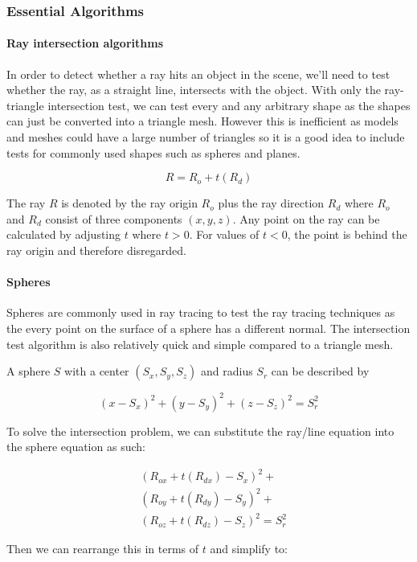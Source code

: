 \documentclass[final]{cmpreport}
\begin{document}
\subsubsection{Essential Algorithms}
\paragraph{Ray intersection algorithms} In order to detect whether a ray hits an object in the scene, we'll need to test whether the ray, as a straight line, intersects with the object. With only the ray-triangle intersection test, we can test every and any arbitrary shape as the shapes can just be converted into a triangle mesh. However this is inefficient as models and meshes could have a large number of triangles so it is a good idea to include tests for commonly used shapes such as spheres and planes.

\[ R = R_o + t(R_d) \]

The ray \( R \) is denoted by the ray origin \( R_o \) plus the ray direction \( R_d \) where \(R_o\) and \(R_d\) consist of three components \((x, y, z)\). Any point on the ray can be calculated by adjusting \(t\) where \(t > 0 \). For values of \(t < 0\), the point is behind the ray origin and therefore disregarded.

\paragraph{Spheres} \citep[]{linesphereintersect} Spheres are commonly used in ray tracing to test the ray tracing techniques as the every point on the surface of a sphere has a different normal. The intersection test algorithm is also relatively quick and simple compared to a triangle mesh.

A sphere \(S\) with a center \((S_x, S_y, S_z)\) and radius \(S_r\) can be described by

\[(x - S_x)^2 + (y - S_y)^2 + (z - S_z)^2 = S_r^2\]

To solve the intersection problem, we can substitute the ray/line equation into the sphere equation as such:

\begin{align}
    &(R_{ox} + t(R_{dx}) - S_x)^2 + \\
    &(R_{oy} + t(R_{dy}) - S_y)^2 + \\
    &(R_{oz} + t(R_{dz}) - S_z)^2 = S_r^2 
\end{align}

Then we can rearrange this in terms of \(t\) and simplify to:
\end{document}
